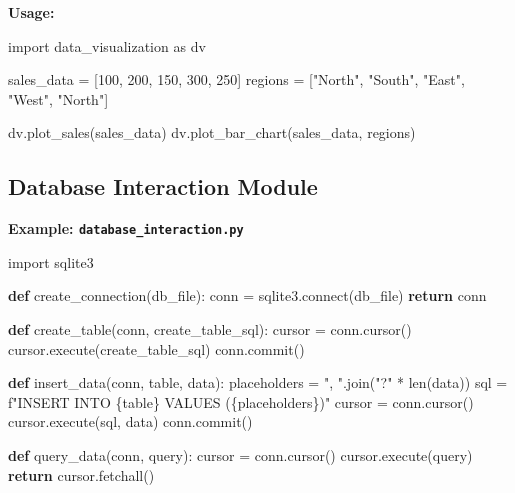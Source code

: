 \documentclass[
  letterpaper,
  DIV=11,
  numbers=noendperiod]{scrreprt}
\newenvironment{Shaded}{\begin{snugshade}}{\end{snugshade}}
\newcommand{\BuiltInTok}[1]{\textcolor[rgb]{0.00,0.23,0.31}{#1}}
\newcommand{\ControlFlowTok}[1]{\textcolor[rgb]{0.00,0.23,0.31}{\textbf{#1}}}
\newcommand{\DecValTok}[1]{\textcolor[rgb]{0.68,0.00,0.00}{#1}}
\newcommand{\ExtensionTok}[1]{\textcolor[rgb]{0.00,0.23,0.31}{#1}}
\newcommand{\ImportTok}[1]{\textcolor[rgb]{0.00,0.46,0.62}{#1}}
\newcommand{\KeywordTok}[1]{\textcolor[rgb]{0.00,0.23,0.31}{\textbf{#1}}}
\newcommand{\NormalTok}[1]{\textcolor[rgb]{0.00,0.23,0.31}{#1}}
\newcommand{\OperatorTok}[1]{\textcolor[rgb]{0.37,0.37,0.37}{#1}}
\newcommand{\SpecialCharTok}[1]{\textcolor[rgb]{0.37,0.37,0.37}{#1}}
\newcommand{\SpecialStringTok}[1]{\textcolor[rgb]{0.13,0.47,0.30}{#1}}
\newcommand{\StringTok}[1]{\textcolor[rgb]{0.13,0.47,0.30}{#1}}
\begin{document}
\textbf{Usage:}

\begin{Shaded}
\begin{Highlighting}[]
\ImportTok{import}\NormalTok{ data\_visualization }\ImportTok{as}\NormalTok{ dv}

\NormalTok{sales\_data }\OperatorTok{=}\NormalTok{ [}\DecValTok{100}\NormalTok{, }\DecValTok{200}\NormalTok{, }\DecValTok{150}\NormalTok{, }\DecValTok{300}\NormalTok{, }\DecValTok{250}\NormalTok{]}
\NormalTok{regions }\OperatorTok{=}\NormalTok{ [}\StringTok{"North"}\NormalTok{, }\StringTok{"South"}\NormalTok{, }\StringTok{"East"}\NormalTok{, }\StringTok{"West"}\NormalTok{, }\StringTok{"North"}\NormalTok{]}

\NormalTok{dv.plot\_sales(sales\_data)}
\NormalTok{dv.plot\_bar\_chart(sales\_data, regions)}
\end{Highlighting}
\end{Shaded}

\subsection{Database Interaction
Module}\label{database-interaction-module}

\textbf{Example: \texttt{database\_interaction.py}}

\begin{Shaded}
\begin{Highlighting}[]
\ImportTok{import}\NormalTok{ sqlite3}

\KeywordTok{def}\NormalTok{ create\_connection(db\_file):}
\NormalTok{    conn }\OperatorTok{=}\NormalTok{ sqlite3.}\ExtensionTok{connect}\NormalTok{(db\_file)}
    \ControlFlowTok{return}\NormalTok{ conn}

\KeywordTok{def}\NormalTok{ create\_table(conn, create\_table\_sql):}
\NormalTok{    cursor }\OperatorTok{=}\NormalTok{ conn.cursor()}
\NormalTok{    cursor.execute(create\_table\_sql)}
\NormalTok{    conn.commit()}

\KeywordTok{def}\NormalTok{ insert\_data(conn, table, data):}
\NormalTok{    placeholders }\OperatorTok{=} \StringTok{", "}\NormalTok{.join(}\StringTok{"?"} \OperatorTok{*} \BuiltInTok{len}\NormalTok{(data))}
\NormalTok{    sql }\OperatorTok{=} \SpecialStringTok{f"INSERT INTO }\SpecialCharTok{\{}\NormalTok{table}\SpecialCharTok{\}}\SpecialStringTok{ VALUES (}\SpecialCharTok{\{}\NormalTok{placeholders}\SpecialCharTok{\}}\SpecialStringTok{)"}
\NormalTok{    cursor }\OperatorTok{=}\NormalTok{ conn.cursor()}
\NormalTok{    cursor.execute(sql, data)}
\NormalTok{    conn.commit()}

\KeywordTok{def}\NormalTok{ query\_data(conn, query):}
\NormalTok{    cursor }\OperatorTok{=}\NormalTok{ conn.cursor()}
\NormalTok{    cursor.execute(query)}
    \ControlFlowTok{return}\NormalTok{ cursor.fetchall()}
\end{Highlighting}
\end{Shaded}
\end{document}

